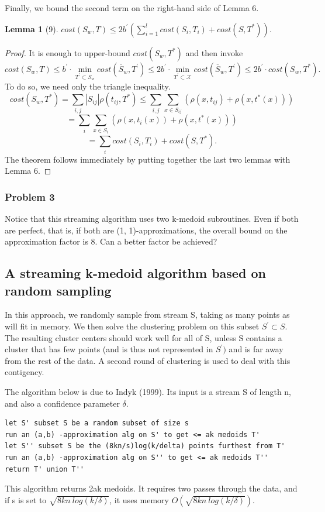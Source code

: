 \documentclass[letterpaper,10pt]{article}
\theoremstyle{plain}
\newtheorem{lemma}{Lemma}
\begin{document}
Finally, we bound the second term on the right-hand side of Lemma 6. 

\begin{lemma}[9]
$cost(S_{w},T)\le2b^{\prime}(\sum_{i=1}^{l}cost(S_{i},T_{i})+cost(S,T^{*}))$. 
\end{lemma}
\begin{proof}
It is enough to upper-bound $cost(S_{w},T^{*})$ and then invoke 
\[
cost(S_{w},T)\le b^{\prime}\cdot \min_{T^{\prime}\subset S_{w}}cost(\overline{S}_{w},T^{\prime})\le2b^{\prime}\cdot \min_{T^{\prime}\subset\mathcal{X}}cost(\overline{S}_{w},T^{\prime})\le2b^{\prime}\cdot cost(S_{w},T^{*}).
\]
To do so, we need only the triangle inequality. 
\[
cost(S_{w},T^{*})=\sum_{i,j}|S_{ij}|\rho(t_{ij},T^{*})\le\sum_{i,j}\sum_{x\in S_{ij}}(\rho(x,t_{ij})+\rho(x,t^{*}(x)))
\]
\[
=\sum_{i}\sum_{x\in S_{i}}(\rho(x,t_{i}(x))+\rho(x,t^{*}(x)))
\]
\[
=\sum_{i}cost(S_{i},T_{i})+cost(S,T^{*}).
\]
The theorem follows immediately by putting together the last two lemmas with Lemma 6.
\end{proof}

\subsubsection*{Problem 3}
Notice that this streaming algorithm uses two k-medoid subroutines.  Even if both are perfect, that is, if both are (1, 1)-approximations, the overall bound on the approximation factor is 8. Can a better factor be achieved? 

\subsection{A streaming k-medoid algorithm based on random sampling}
In this approach, we randomly sample from stream S, taking as many points as will fit in memory.  We then solve the clustering problem on this subset $S^{\prime}\subset S.$  The resulting cluster centers should work well for all of S, unless S contains a cluster that has few points (and is thus not represented in $S^{\prime})$ and is far away from the rest of the data.  A second round of clustering is used to deal with this contigency. 

The algorithm below is due to Indyk (1999).  Its input is a stream S of length n, and also a confidence parameter $\delta$. 
\begin{verbatim}
let S' subset S be a random subset of size s
run an (a,b) -approximation alg on S' to get <= ak medoids T'
let S'' subset S be the (8kn/s)log(k/delta) points furthest from T'
run an (a,b) -approximation alg on S'' to get <= ak medoids T''
return T' union T''
\end{verbatim}
This algorithm returns 2ak medoids.  It requires two passes through the data, and if s is set to $\sqrt{8kn~log(k/\delta)}$, it uses memory $O(\sqrt{8kn~log(k/\delta)})$. 
\end{document}
